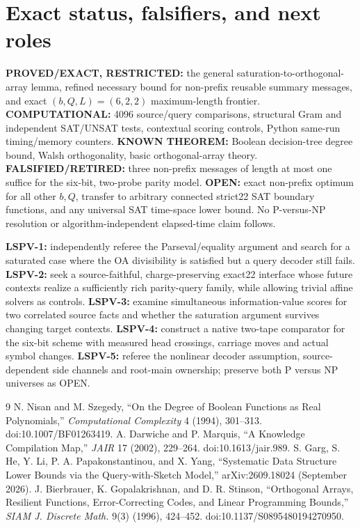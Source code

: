 \documentclass[10pt]{article}
\begin{document}
\section{Exact status, falsifiers, and next roles}
\noindent\textbf{PROVED/EXACT, RESTRICTED:} the general saturation-to-orthogonal-array lemma, refined necessary bound for non-prefix reusable summary messages, and exact \((b,Q,L)=(6,2,2)\) maximum-length frontier. \textbf{COMPUTATIONAL:} 4096 source/query comparisons, structural Gram and independent SAT/UNSAT tests, contextual scoring controls, Python same-run timing/memory counters. \textbf{KNOWN THEOREM:} Boolean decision-tree degree bound, Walsh orthogonality, basic orthogonal-array theory. \textbf{FALSIFIED/RETIRED:} three non-prefix messages of length at most one suffice for the six-bit, two-probe parity model. \textbf{OPEN:} exact non-prefix optimum for all other \(b,Q\), transfer to arbitrary connected strict22 SAT boundary functions, and any universal SAT time-space lower bound. No P-versus-NP resolution or algorithm-independent elapsed-time claim follows.

\noindent\textbf{LSPV-1:} independently referee the Parseval/equality argument and search for a saturated case where the OA divisibility is satisfied but a query decoder still fails. \textbf{LSPV-2:} seek a source-faithful, charge-preserving exact22 interface whose future contexts realize a sufficiently rich parity-query family, while allowing trivial affine solvers as controls. \textbf{LSPV-3:} examine simultaneous information-value scores for two correlated source facts and whether the saturation argument survives changing target contexts. \textbf{LSPV-4:} construct a native two-tape comparator for the six-bit scheme with measured head crossings, carriage moves and actual symbol changes. \textbf{LSPV-5:} referee the nonlinear decoder assumption, source-dependent side channels and root-main ownership; preserve both P versus NP universes as OPEN.

\begin{thebibliography}{9}
 N. Nisan and M. Szegedy, ``On the Degree of Boolean Functions as Real Polynomials,'' \emph{Computational Complexity} 4 (1994), 301--313. doi:10.1007/BF01263419.
 A. Darwiche and P. Marquis, ``A Knowledge Compilation Map,'' \emph{JAIR} 17 (2002), 229--264. doi:10.1613/jair.989.
 S. Garg, S. He, Y. Li, P. A. Papakonstantinou, and X. Yang, ``Systematic Data Structure Lower Bounds via the Query-with-Sketch Model,'' arXiv:2609.18024 (September 2026).
 J. Bierbrauer, K. Gopalakrishnan, and D. R. Stinson, ``Orthogonal Arrays, Resilient Functions, Error-Correcting Codes, and Linear Programming Bounds,'' \emph{SIAM J. Discrete Math.} 9(3) (1996), 424--452. doi:10.1137/S0895480194270950.
\end{thebibliography}
\end{document}
